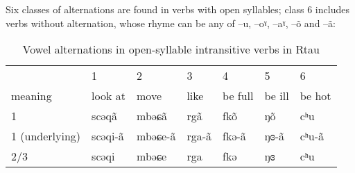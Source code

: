 \documentclass[oneside,a4paper,11pt]{article}
\newcommand{\ipa}[1]{{\phon #1}} %
\begin{document}
Six classes of alternations are found in verbs with open syllables; class 6 includes verbs without alternation, whose rhyme can be any of --\ipa{u}, --\ipa{oˠ}, --\ipa{aˠ}, --\ipa{õ} and --\ipa{ã}:
\begin{table}[H]
\caption{Vowel alternations in open-syllable intransitive verbs in Rtau} \label{tab:open.intr} \centering
\begin{tabular}{llll|ll|l}
\toprule
&1&2&3&4&5&6 \\
meaning &	look at   &  	move   &  	like&  	be full     &  	 	be ill      &  	be hot       \\  
\midrule
1&	\ipa{scəqã} & 	\ipa{mbəɕã} & \ipa{rgã} &	\ipa{fkõ} & 	  	\ipa{ŋõ} & 	   	\ipa{cʰu}   \\ 
1 (underlying)&	\ipa{scəqi-ã} & 	\ipa{mbəɕe-ã} & \ipa{rga-ã} &	\ipa{fkə-ã} & 	  	\ipa{ŋɞ-ã} & 	   	\ipa{cʰu-ã}   \\ 
2/3&	\ipa{scəqi} & 	\ipa{mbəɕe} & \ipa{rga} & 	\ipa{fkə} & 	  	\ipa{ŋɞ} & 	 	\ipa{cʰu}  \\ 
\bottomrule
\end{tabular}
\end{table}
\end{document}
